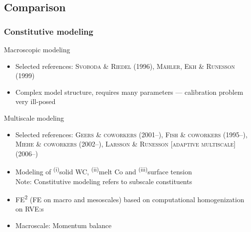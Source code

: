 \documentclass[11pt,mathserif]{beamer}
\newcommand{\roughcite}[1]{\textsc{#1}}
\begin{document}
\begin{frame}
\begin{center}
\begin{columns}
 \end{columns}

\end{center}
\end{frame}

\subsection{Comparison}
\begin{frame}
 \frametitle{Constitutive modeling}
 Macroscopic modeling
 \begin{itemize}
  \item Selected references: \roughcite{Svoboda \& Riedel (1996)}, \roughcite{Mähler, Ekh \& Runesson (1999)}
  \item Complex model structure, requires many parameters --- calibration problem very ill-posed
 \end{itemize}

 Multiscale modeling
 \begin{itemize}
  \item Selected references:  \roughcite{Geers \& coworkers (2001--)},
 \roughcite{Fish \& coworkers (1995--)},
 \roughcite{Miehe \& coworkers (2002--)},
 \roughcite{Larsson \& Runesson [adaptive multiscale] (2006--)}
  \item Modeling of \textsuperscript{(i)}solid WC, \textsuperscript{(ii)}melt Co and \textsuperscript{(iii)}surface tension\\
  Note: Constitutive modeling refers to subscale constituents
  \item FE\textsuperscript{2} (FE on macro and mesoscales) based on computational homogenization on RVE:s
  \item Macroscale: Momentum balance
 \end{itemize}
\end{frame}
\end{document}
